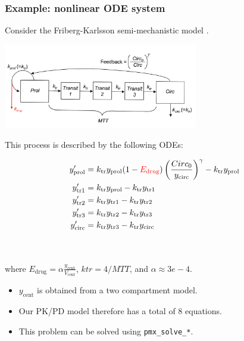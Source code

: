 \documentclass[xcolor=table]{beamer}
\begin{document}
\begin{frame}
  \frametitle{Example: nonlinear ODE system}
  
  Consider the Friberg-Karlsson semi-mechanistic model \cite{Friberg:2002}.
  
  \begin{center}
    \includegraphics[width=8.5cm]{../figures/Friberg-Karlsson_drug}
  \end{center}

\end{frame}

\begin{frame}
  This process is described by the following ODEs:
  
  \begin{eqnarray*}
  \begin{aligned}
  y_{\mathrm{prol}}' &= k_{\mathrm{tr}} y_{\mathrm{prol}} (1 - {\color{red}E_{\mathrm{drug}}})\left(\frac{Circ_0}
    {y_{\mathrm{circ}}}\right)^\gamma - k_{\mathrm{tr}}y_{\mathrm{prol}} \\
  y_{\mathrm{tr1}}' &= k_{\mathrm{tr}} y_{\mathrm{prol}} - k_{\mathrm{tr}} y_{\mathrm{tr1}} \\
  y_{\mathrm{tr2}}' &= k_{\mathrm{tr}} y_{\mathrm{tr1}} - k_{\mathrm{tr}} y_{\mathrm{tr2}} \\
  y_{\mathrm{tr3}}' &= k_{\mathrm{tr}} y_{\mathrm{tr2}} - k_{\mathrm{tr}} y_{\mathrm{tr3}} \\
  y_{\mathrm{circ}}' &= k_{\mathrm{tr}} y_{\mathrm{tr3}} - k_{\mathrm{tr}} y_{\mathrm{circ}} 
  \end{aligned}
  \label{eq:FK}
\end{eqnarray*}

\ \\ \ \\
  where $E_\mathrm{drug} = \alpha \frac{y_{\mathrm{cent}}}{V_{\mathrm{cent}}}$,
  $ktr = 4 / MTT$,
  and $\alpha \approx 3e-4$.

\end{frame}

\begin{frame}

  \begin{itemize}
    \item $y_\mathrm{cent}$ is obtained from a two compartment model.
    \item Our PK/PD model therefore has a total of 8 equations.
    \item This problem can be solved using \texttt{pmx\_solve\_*}.
  \end{itemize}

\end{frame}
\end{document}
